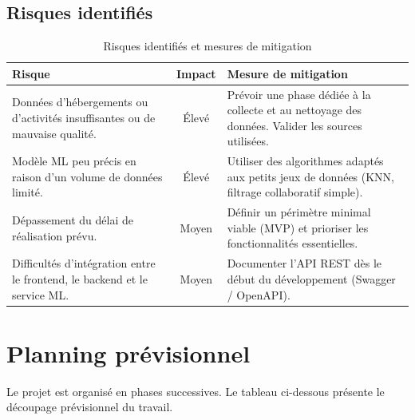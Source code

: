 \documentclass[12pt,a4paper]{report}
\begin{document}
\section{Risques identifiés}

\begin{table}[H]
\centering
\renewcommand{\arraystretch}{1.4}
\begin{tabularx}{\textwidth}{|p{4.5cm}|c|X|}
\hline
\textbf{Risque} & \textbf{Impact} & \textbf{Mesure de mitigation} \\
\hline
Données d'hébergements ou d'activités insuffisantes ou de mauvaise qualité. &
  Élevé & Prévoir une phase dédiée à la collecte et au nettoyage des données.
  Valider les sources utilisées. \\
\hline
Modèle ML peu précis en raison d'un volume de données limité. &
  Élevé & Utiliser des algorithmes adaptés aux petits jeux de données (KNN,
  filtrage collaboratif simple). \\
\hline
Dépassement du délai de réalisation prévu. &
  Moyen & Définir un périmètre minimal viable (MVP) et prioriser les
  fonctionnalités essentielles. \\
\hline
Difficultés d'intégration entre le frontend, le backend et le service ML. &
  Moyen & Documenter l'API REST dès le début du développement
  (Swagger / OpenAPI). \\
\hline
\end{tabularx}
\caption{Risques identifiés et mesures de mitigation}
\end{table}

\chapter{Planning prévisionnel}

Le projet est organisé en phases successives. Le tableau ci-dessous présente le
découpage prévisionnel du travail.
\end{document}
